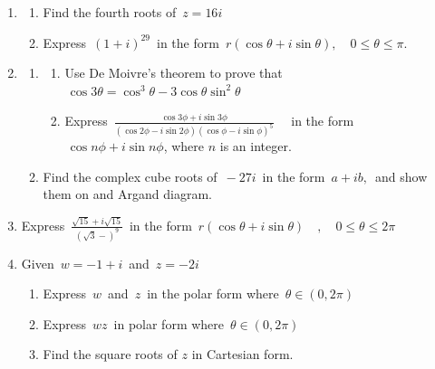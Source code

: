 \documentclass[11pt,a4paper]{article}
\theoremstyle{definition}
\begin{document}
\begin{enumerate}
\item
\begin{enumerate}
      \item Find the fourth roots of $\, z = 16i$
      
      \item Express $\, \left( 1 + i\right)^{29}\,$ in the form $\, r \left(\cos \theta + i \sin \theta \right), \quad  0\leq \theta \leq \pi$.\\
\end{enumerate}


\item
\begin{enumerate}
    \item
\begin{enumerate}
          \item  Use De Moivre's theorem to prove that $\, \cos 3 \theta  = \cos^3\theta - 3\cos \theta \sin^2\theta$
          
          \item Express $\,\frac{\cos 3\phi + i\sin 3\phi}{\left(\cos 2\phi - i \sin 2\phi\right)\left(\cos \phi - i\sin \phi\right)^5}\quad $ in the form $\, \cos n \phi + i \sin n\phi$, where $n$ is an integer.
\end{enumerate}    
    
    \item Find the complex cube roots of $\, -27i\,$ in the form $\, a + ib,\,$ and show them on and Argand diagram.\\
\end{enumerate}




\item Express $\,\frac{\sqrt{15} + i\sqrt{15}}{\left(\sqrt{3} - \right)^9}\,$ in the form $\, r\left(\cos \theta + i\sin \theta \right)\quad , \quad  0\leq \theta \leq 2\pi$\\


\item Given $\, w = - 1 + i\,$ and $\, z = -2i$
\begin{enumerate}
      \item Express $\, w\,$ and $\, z\,$ in the polar form where $\, \theta \in \left(0, 2\pi\right)$
      
      \item Express $\,wz\,$ in polar form where $\, \theta \in \left(0, 2\pi\right)$
      
      \item Find the square roots of $z$ in Cartesian form.\\
\end{enumerate}



\end{enumerate}
\end{document}
